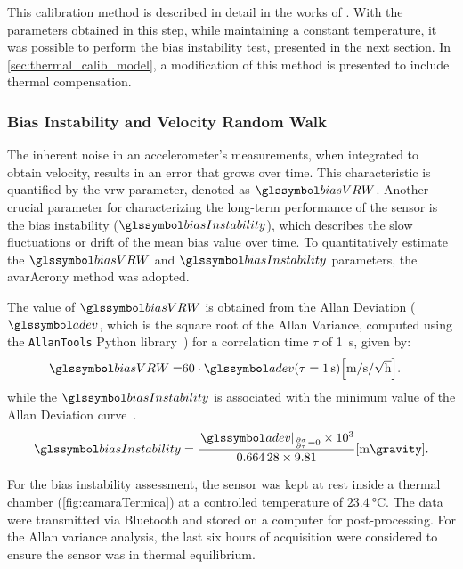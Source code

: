 \documentclass[sensors,article,accept,pdftex,moreauthors]{Definitions/mdpi}
\begin{document}
This calibration method is described in detail in the works of \cite{Silva2021,Kuncar2017}. With the parameters obtained in this step, while maintaining a constant temperature, it was possible to perform the bias instability test, presented in the next section. In \cref{sec:thermal_calib_model}, a modification of this method is presented to include thermal compensation.

\subsubsection{{Bias} Instability and Velocity Random Walk\protect\label{sec:bias_stability}}

The inherent noise in an accelerometer's measurements, when integrated to obtain velocity, results in an error that grows over time. This characteristic is quantified by the \gls{vrw} parameter, denoted as $\biasVRW$. Another crucial parameter for characterizing the long-term performance of the sensor is the {bias} instability ($\biasInstability$), which describes the slow fluctuations or drift of the mean {bias} value over time. To quantitatively estimate the $\biasVRW$ and $\biasInstability$ parameters, the \gls{avarAcrony} method was adopted.

The value of $\biasVRW$ is obtained from the Allan Deviation ($\adev$, which is the square root of the Allan Variance, computed using the \texttt{AllanTools} Python library~\citep{allantools}) for a correlation time $\tau$ of \SI{1}{\second}, given by:
\begin{align}
	\biasVRW= & 60\cdot\adev\left(\tau=\SI{1}{\s}\right)\left[\si{\m\per\s\per\sqrt{\hour}}\right].
	\label{eq:-18-1-new}
\end{align}
while the $\biasInstability$ is associated with the minimum value of the Allan Deviation curve~\citep{Li2013a}.
\begin{equation}
	\biasInstability=\frac{\left.\adev\right|_{\frac{\partial\sigma}{\partial\tau}=0}\times{10}^{3}}{\num{0.66428}\times\num{9.81}}\left[\si{\milli\gravity}\right].
	\label{eq:-19-1-new}
\end{equation}

For the bias instability assessment, the sensor was kept at rest inside a thermal chamber (\cref{fig:camaraTermica}) at a controlled temperature of $\SI{23.4}{\celsius}$. The data were transmitted via {Bluetooth} and stored on a computer for post-processing. For the Allan variance analysis, the last six hours of acquisition were considered to ensure the sensor was in thermal equilibrium.
\end{document}
